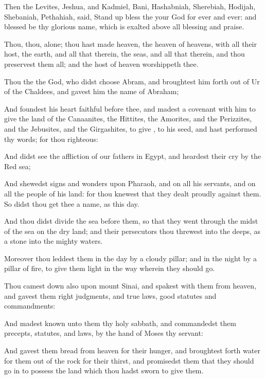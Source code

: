 {Then the
Levites,
Jeshua, and
Kadmiel,
Bani,
Hashabniah,
Sherebiah,
Hodijah,
Shebaniah,
{}
Pethahiah,
said, Stand
up
{}
bless the
{} your
God for
ever and
ever: and
blessed be thy
glorious
name, which is
exalted above all
blessing and
praise.

Thou,
{} thou,
{}
{} alone; thou hast
made
heaven, the
heaven of
heavens, with all their
host, the
earth, and all
{} that
{} therein, the
seas, and all that
{} therein, and thou
preservest them all; and the
host of
heaven
worshippeth thee.

Thou
{} the
{} the
God, who didst
choose
Abram, and broughtest him
forth out of
Ur of the
Chaldees, and
gavest him the
name of
Abraham;

And
foundest his
heart
faithful
before thee, and
madest a
covenant with him to
give the
land of the
Canaanites, the
Hittites, the
Amorites, and the
Perizzites, and the
Jebusites, and the
Girgashites, to
give
{}, to his
seed, and hast
performed thy
words; for thou
{}
righteous:

And didst
see the
affliction of our
fathers in
Egypt, and
heardest their
cry by the
Red
sea;

And
shewedst
signs and
wonders upon
Pharaoh, and on all his
servants, and on all the
people of his
land: for thou
knewest that they dealt
proudly against them. So didst thou
get thee a
name, as
{} this
day.

And thou didst
divide the
sea
before them, so that they went
through the
midst of the
sea on the dry
land; and their
persecutors thou
threwest into the
deeps, as a
stone into the
mighty
waters.

Moreover thou
leddest them in the
day by a
cloudy
pillar; and in the
night by a
pillar of
fire, to give them
light in the
way wherein they should
go.

Thou camest
down also upon
mount
Sinai, and
spakest with them from
heaven, and
gavest them
right
judgments, and
true
laws,
good
statutes and
commandments:

And madest
known unto them thy
holy
sabbath, and
commandedst them
precepts,
statutes, and
laws, by the
hand of
Moses thy
servant:

And
gavest them
bread from
heaven for their
hunger, and broughtest
forth
water for them out of the
rock for their
thirst, and
promisedst them that they should go
in to
possess the
land which thou hadst
sworn to
give them.

}
